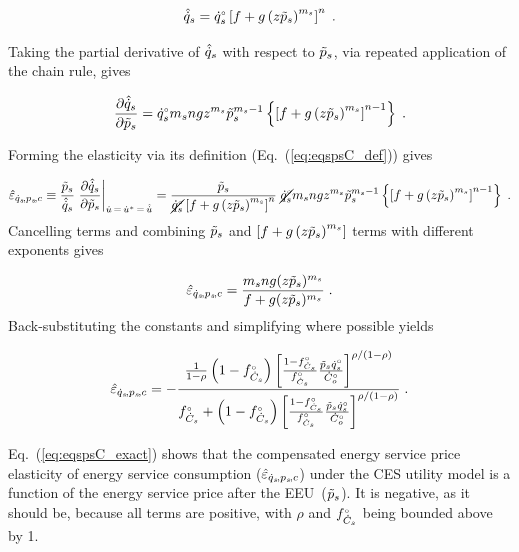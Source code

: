 \documentclass[12pt]{article}\usepackage[]{graphicx}\usepackage[]{xcolor}
\begin{document}
\begin{equation} 
  \hat{\dot{q}}_s = {}{\dot{q}}^{\scriptscriptstyle \circ}_s \left[ f + g \left( z \tilde{p}_s \right) ^ {m_s} \right] ^ n \; .
\end{equation}

Taking the partial derivative of $\hat{\dot{q}}_s$ with respect to $\tilde{p}_s$,
via repeated application of the chain rule, gives

\begin{equation}
  \pdv{\hat{\dot{q}}_s}{\tilde{p}_s} = {}{\dot{q}}^{\scriptscriptstyle \circ}_s m_s n g z^{m_s} \tilde{p}_s^{m_s-1} 
                \left\{ \left[ f + g \left( z \tilde{p}_s \right)^{m_s} \right]^{n-1} \right\} \; .
\end{equation}

Forming the elasticity via its definition (Eq.~(\ref{eq:eqspsC_def})) gives

\begin{equation}
  \eqspsChat \equiv \frac{\amacro{p}_s}{\rasub{q}_s} \eval{\pdv{\rasub{q}_s}{\amacro{p}_s}}_{\rate{u} \, = \, \rbsub{u} \, = \, \rasub{u}} 
         = \frac{\amacro{p}_s}{\cancel{\rorig{q}_s} \left[ f + g \left( z \amacro{p}_s \right)^{m_s} \right]^n } \;
           \cancel{\rorig{q}_s} m_s n g z^{m_s} \amacro{p}_s^{m_s - 1} 
                \left\{ \left[ f + g \left( z \amacro{p}_s \right)^{m_s} \right]^{n-1} \right\} \; .
\end{equation}
%
Cancelling terms and
combining $\tilde{p}_s$ and $\left[ f + g \left( z \tilde{p}_s \right)^{m_s} \right]$ 
terms with different exponents gives

\begin{equation} \label{eq:eqspsC_exact_simple}
  \hat{\varepsilon}_{\dot{q}_s\!,p_s\!,c} = \frac{m_s n g (z \tilde{p}_s)^{m_s}}{f + g(z \tilde{p}_s)^{m_s}} \; .
\end{equation}
%
Back-substituting the constants and simplifying where possible yields

\begin{equation} \label{eq:eqspsC_exact}
  \hat{\varepsilon}_{\dot{q}_s\!,p_s\!,c} = - \frac{\frac{1}{1 - \rho} \left( 1 - {}{f}^{\scriptscriptstyle \circ}_{\dot{C}_s} \right) \left[ \frac{1 - {}{f}^{\scriptscriptstyle \circ}_{\dot{C}_s}}{{}{f}^{\scriptscriptstyle \circ}_{\dot{C}_s}} \frac{\tilde{p}_s {}{\dot{q}}^{\scriptscriptstyle \circ}_s}{{}{\dot{C}}^{\scriptscriptstyle \circ}_o} \right] ^ {\rho / (1 - \rho)} }{{}{f}^{\scriptscriptstyle \circ}_{\dot{C}_s} + \left( 1 - {}{f}^{\scriptscriptstyle \circ}_{\dot{C}_s} \right) \left[ \frac{1 - {}{f}^{\scriptscriptstyle \circ}_{\dot{C}_s}}{{}{f}^{\scriptscriptstyle \circ}_{\dot{C}_s}} \frac{\tilde{p}_s {}{\dot{q}}^{\scriptscriptstyle \circ}_s}{{}{\dot{C}}^{\scriptscriptstyle \circ}_o} \right] ^ {\rho / (1 - \rho)} } \; .
\end{equation}

Eq.~(\ref{eq:eqspsC_exact}) shows that the compensated 
energy service price elasticity of energy service consumption ($\hat{\varepsilon}_{\dot{q}_s\!,p_s\!,c}$)
under the CES utility model is a function 
of the energy service price after the EEU~($\tilde{p}_s$). It is negative,
as it should be, because all terms are positive, with $\rho$ and ${}{f}^{\scriptscriptstyle \circ}_{\dot{C}_s}$ being bounded above by 1.
\end{document}

